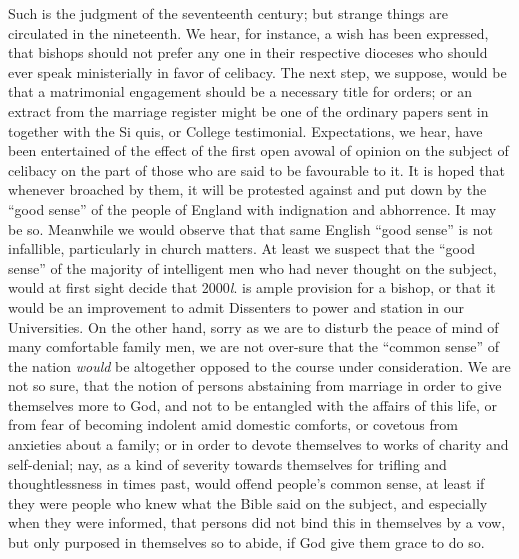 Such is the judgment of the seventeenth century;
but strange things are circulated in the nineteenth. We hear, for
instance, a wish has been expressed, that bishops should not prefer any
one in their respective dioceses who should ever speak ministerially in
favor of celibacy. The next step, we suppose, would be that a
matrimonial engagement should be a necessary title for orders; or an
extract from the marriage register might be one of the ordinary papers
sent in together with the Si quis, or College testimonial. Expectations,
we hear, have been entertained of the effect of the first open avowal of
opinion on the subject of celibacy on the part of those who are said to
be favourable to it. It is hoped that whenever broached by them, it will
be protested against and put down by the ``good sense'' of the people of
England with indignation and abhorrence. It may be so. Meanwhile we
would observe that that same English ``good sense'' is not infallible,
particularly in church matters. At least we suspect that the ``good sense''
of the majority of intelligent men who had never thought on the subject,
would at first sight decide that 2000\emph{l}. is ample provision for a
bishop, or that it would be an improvement to admit Dissenters to power
and station in our Universities. On the other hand, sorry as we are to
disturb the peace of mind of many comfortable family men, we are not
over-sure that the ``common sense'' of the nation \emph{would} be
altogether opposed to the course under consideration. We are not so
sure, that the notion of persons abstaining from marriage in order to
give themselves more to God, and not to be entangled with the affairs of
this life, or from fear of becoming indolent amid domestic comforts, or
covetous from anxieties about a family; or in order to devote themselves
to works of charity and self-denial; nay, as a kind of severity towards
themselves for trifling and thoughtlessness in times past, would offend
people's common sense, at least if they were people who knew what the
Bible said on the subject, and especially when they were informed, that
persons did not bind this in themselves by a vow, but only purposed in
themselves so to abide, if God give them grace to do so.

